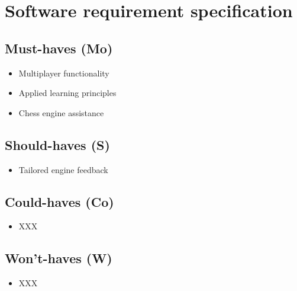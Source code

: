 \section{Software requirement specification}\label{sec:software-requirement-specification}

\subsection{Must-haves (Mo)}\label{subsec:must-haves}

\begin{itemize}
    \item Multiplayer functionality
    \item Applied learning principles
    \item Chess engine assistance
\end{itemize}

\subsection{Should-haves (S)}\label{subsec:should-haves}

\begin{itemize}
    \item Tailored engine feedback
\end{itemize}

\subsection{Could-haves (Co)}\label{subsec:could-haves}

\begin{itemize}
    \item XXX
\end{itemize}

\subsection{Won't-haves (W)}\label{subsec:wont-haves}

\begin{itemize}
    \item XXX
\end{itemize}
